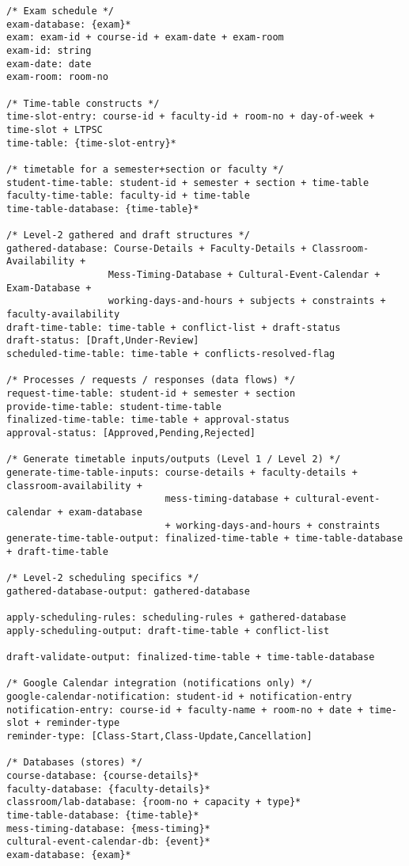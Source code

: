 \documentclass[12pt]{article}
\begin{document}
{\begin{verbatim}
/* Exam schedule */
exam-database: {exam}*
exam: exam-id + course-id + exam-date + exam-room
exam-id: string
exam-date: date
exam-room: room-no

/* Time-table constructs */
time-slot-entry: course-id + faculty-id + room-no + day-of-week + time-slot + LTPSC
time-table: {time-slot-entry}*

/* timetable for a semester+section or faculty */
student-time-table: student-id + semester + section + time-table
faculty-time-table: faculty-id + time-table
time-table-database: {time-table}*

/* Level-2 gathered and draft structures */
gathered-database: Course-Details + Faculty-Details + Classroom-Availability +
                  Mess-Timing-Database + Cultural-Event-Calendar + Exam-Database +
                  working-days-and-hours + subjects + constraints + faculty-availability
draft-time-table: time-table + conflict-list + draft-status
draft-status: [Draft,Under-Review]
scheduled-time-table: time-table + conflicts-resolved-flag

/* Processes / requests / responses (data flows) */
request-time-table: student-id + semester + section
provide-time-table: student-time-table
finalized-time-table: time-table + approval-status
approval-status: [Approved,Pending,Rejected]

/* Generate timetable inputs/outputs (Level 1 / Level 2) */
generate-time-table-inputs: course-details + faculty-details + classroom-availability +
                            mess-timing-database + cultural-event-calendar + exam-database 
                            + working-days-and-hours + constraints
generate-time-table-output: finalized-time-table + time-table-database + draft-time-table

/* Level-2 scheduling specifics */
gathered-database-output: gathered-database

apply-scheduling-rules: scheduling-rules + gathered-database
apply-scheduling-output: draft-time-table + conflict-list

draft-validate-output: finalized-time-table + time-table-database

/* Google Calendar integration (notifications only) */
google-calendar-notification: student-id + notification-entry
notification-entry: course-id + faculty-name + room-no + date + time-slot + reminder-type
reminder-type: [Class-Start,Class-Update,Cancellation]

/* Databases (stores) */
course-database: {course-details}*
faculty-database: {faculty-details}*
classroom/lab-database: {room-no + capacity + type}*
time-table-database: {time-table}*
mess-timing-database: {mess-timing}*
cultural-event-calendar-db: {event}*
exam-database: {exam}*
\end{verbatim}
}
\newpage
\end{document}
